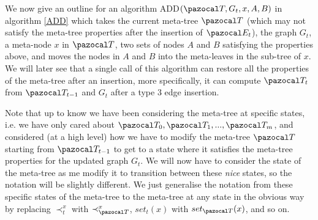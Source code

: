 \documentclass{report}
\begin{document}
We now give an outline for an algorithm ADD$(\pazocal T,G_t,x,A,B)$ in algorithm \ref{ADD} which takes the current meta-tree $\pazocal T$ (which may not satisfy the meta-tree properties after the insertion of $\pazocal E_t$), the graph $G_t$, a meta-node $x$ in $\pazocal T$, two sets of nodes $A$ and $B$ satisfying the properties above, and moves the nodes in $A$ and $B$ into the meta-leaves in the sub-tree of $x$. We will later see that a single call of this algorithm can restore all the properties of the meta-tree after an insertion, more specifically, it can compute $\pazocal T_t$ from $\pazocal T_{t-1}$ and $G_t$ after a type 3 edge insertion.

Note that up to know we have been considering the meta-tree at specific states, i.e. we have only cared about $\pazocal T_0, \pazocal T_1,..., \pazocal T_m$, and considered (at a high level) how we have to modify the meta-tree $\pazocal T$ starting from $\pazocal T_{t-1}$ to get to a state where it satisfies the meta-tree properties for the updated graph $G_t$. We will now have to consider the state of the meta-tree as me modify it to transition between these \textit{nice} states, so the notation will be slightly different. We just generalise the notation from these specific states of the meta-tree to the meta-tree at any state in the obvious way by replacing $\prec_t^x$ with $\prec_{\pazocal T}^x$, $set_t(x)$ with $set_{\pazocal T}(x)$, and so on.\newline
\end{document}
